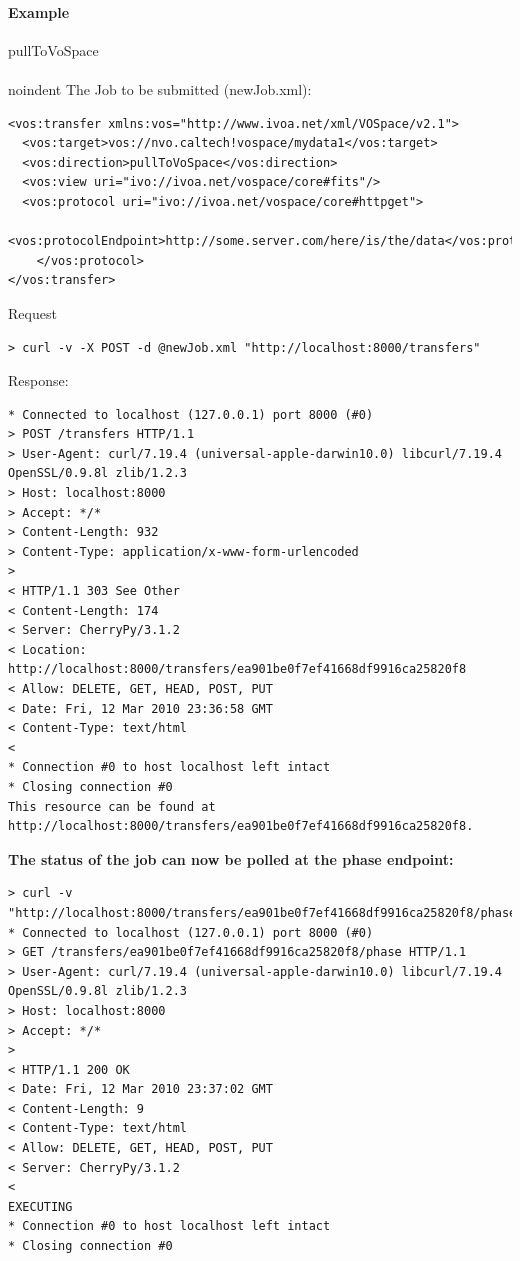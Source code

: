 \documentclass[11pt,a4paper]{ivoa}
\begin{document}
\paragraph{Example}
pullToVoSpace
\\[5px]
\\noindent
The Job to be submitted (newJob.xml):
\begin{lstlisting}
<vos:transfer xmlns:vos="http://www.ivoa.net/xml/VOSpace/v2.1">
  <vos:target>vos://nvo.caltech!vospace/mydata1</vos:target>
  <vos:direction>pullToVoSpace</vos:direction>
  <vos:view uri="ivo://ivoa.net/vospace/core#fits"/>
  <vos:protocol uri="ivo://ivoa.net/vospace/core#httpget">
    <vos:protocolEndpoint>http://some.server.com/here/is/the/data</vos:protocolEndpoint>
    </vos:protocol>
</vos:transfer>
\end{lstlisting}
Request
\begin{lstlisting}
> curl -v -X POST -d @newJob.xml "http://localhost:8000/transfers"
\end{lstlisting}
Response:
\begin{lstlisting}
* Connected to localhost (127.0.0.1) port 8000 (#0)
> POST /transfers HTTP/1.1
> User-Agent: curl/7.19.4 (universal-apple-darwin10.0) libcurl/7.19.4 OpenSSL/0.9.8l zlib/1.2.3
> Host: localhost:8000
> Accept: */*
> Content-Length: 932
> Content-Type: application/x-www-form-urlencoded
> 
< HTTP/1.1 303 See Other
< Content-Length: 174
< Server: CherryPy/3.1.2
< Location: http://localhost:8000/transfers/ea901be0f7ef41668df9916ca25820f8
< Allow: DELETE, GET, HEAD, POST, PUT
< Date: Fri, 12 Mar 2010 23:36:58 GMT
< Content-Type: text/html
< 
* Connection #0 to host localhost left intact
* Closing connection #0
This resource can be found at http://localhost:8000/transfers/ea901be0f7ef41668df9916ca25820f8.
\end{lstlisting}
\textbf{The status of the job can now be polled at the phase endpoint:} \\
\begin{lstlisting}
> curl -v "http://localhost:8000/transfers/ea901be0f7ef41668df9916ca25820f8/phase"
* Connected to localhost (127.0.0.1) port 8000 (#0)
> GET /transfers/ea901be0f7ef41668df9916ca25820f8/phase HTTP/1.1
> User-Agent: curl/7.19.4 (universal-apple-darwin10.0) libcurl/7.19.4 OpenSSL/0.9.8l zlib/1.2.3
> Host: localhost:8000
> Accept: */*
> 
< HTTP/1.1 200 OK
< Date: Fri, 12 Mar 2010 23:37:02 GMT
< Content-Length: 9
< Content-Type: text/html
< Allow: DELETE, GET, HEAD, POST, PUT
< Server: CherryPy/3.1.2
<
EXECUTING
* Connection #0 to host localhost left intact
* Closing connection #0
\end{lstlisting}
\end{document}
